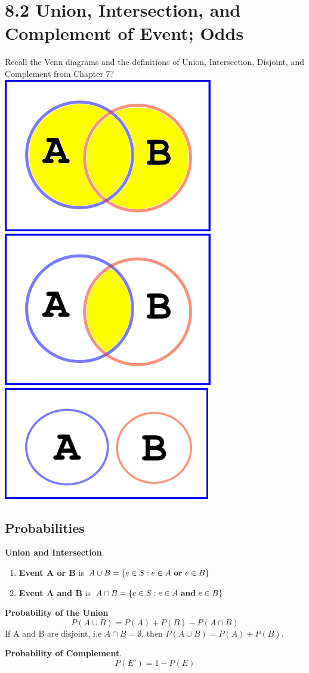 \documentclass[14pt]{extarticle}
\begin{document}
\section*{8.2 Union, Intersection, and Complement of Event; Odds}
Recall the Venn diagrams and the definitions of Union, Intersection, Disjoint, and Complement from Chapter 7?
\\
\includegraphics[width=0.3\linewidth]{union}\includegraphics[width=0.3\linewidth]{intersect}
\includegraphics[width=0.3\linewidth]{disjoint}
\\
\subsection{Probabilities}
\begin{tcolorbox}[enhanced jigsaw,colback=bg,boxrule=0pt,arc=0pt] 
	\textbf{Union and Intersection}.
	\begin{enumerate}
		\item \textbf{Event A or B} is $A\cup B = \{e \in S : e \in A \text{ \textbf{or} } e \in B\}$
		\item \textbf{Event A and B} is $A\cap B = \{e \in S : e \in A \text{ \textbf{and} } e \in B\}$
	\end{enumerate}
	\textbf{Probability of the Union}
	$$ P(A\cup B)= P(A) + P(B) -P(A\cap B)$$
	If A and B are disjoint, i.e $A\cap B = \emptyset$, then $P(A\cup B) = P(A) + P(B)$.
\end{tcolorbox}
\begin{tcolorbox}[enhanced jigsaw,colback=bg,boxrule=0pt,arc=0pt] 
	\textbf{Probability of Complement}.
	$$ P(E')= 1-P(E) $$
\end{tcolorbox}
\end{document}
